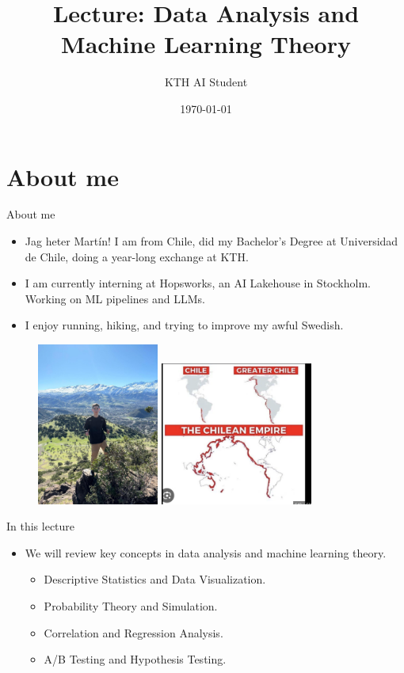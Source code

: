 \documentclass{beamer}
\title{Lecture: Data Analysis and Machine Learning Theory}
\author{KTH AI Student}
\date{\today}
\begin{document}
\frame{\titlepage}

\section{About me}
\begin{frame}{About me}
\begin{itemize}
    \item Jag heter Martín! I am from Chile, did my Bachelor's Degree at Universidad de Chile, doing a year-long exchange at KTH.
    \item I am currently interning at Hopsworks, an AI Lakehouse in Stockholm. Working on ML pipelines and LLMs.
    \item I enjoy running, hiking, and trying to improve my awful Swedish.
\end{itemize}
\begin{figure}
    \centering
    \includegraphics[width=4cm]{imgs/me.jpeg}
    \includegraphics[width=5cm]{imgs/empire.png}
\end{figure}
\end{frame}

\begin{frame}{In this lecture}
    \begin{itemize}
        \item We will review key concepts in data analysis and machine learning theory.
        \begin{itemize}
            \item Descriptive Statistics and Data Visualization.
            \item Probability Theory and Simulation.
            \item Correlation and Regression Analysis.
            \item A/B Testing and Hypothesis Testing.
        \end{itemize}
    \end{itemize}
    \end{frame}
    
\end{document}
